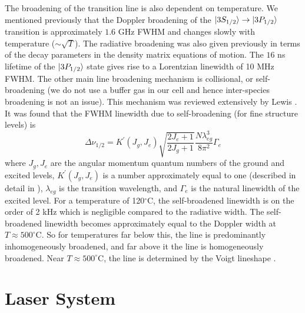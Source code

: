 The broadening of the transition line is also dependent on temperature.  We
mentioned previously that the Doppler broadening of the
$\vert 3S_{1/2} \rangle\rightarrow\vert 3P_{1/2} \rangle$ transition is approximately $1.6$ GHz
FWHM and changes slowly with temperature ($\sim \sqrt{T}$).  The
radiative broadening was also given previously in terms of the decay parameters
in the density matrix equations of motion.  The $16$ ns lifetime of the
$\vert 3P_{1/2} \rangle$ state gives rise to a Lorentzian linewidth of 10 MHz FWHM.
The other main line broadening mechanism is collisional, or self-broadening (we
do not use a buffer gas in our cell and hence inter-species broadening is not
an issue).  This mechanism was reviewed extensively by Lewis \cite{Lewis:80}. 
It was found that the FWHM linewidth due to self-broadening (for fine structure
levels) is
\begin{equation}
\Delta \nu_{1/2} = K^{'}(J_g,J_e)\sqrt{\frac{2J_e+1}{2J_g+1}} \frac{N
\lambda_{eg}^3}{8 \pi^2}\Gamma_e
\end{equation}
where $J_g,J_e$ are the angular momentum quantum numbers of the ground and
excited levels, $K^{'}(J_g,J_e)$ is a number approximately equal to one
(described in detail in \cite{Lewis:80}),
$\lambda_{eg}$ is the transition wavelength, and $\Gamma_e$ is the natural
linewidth of the excited level.  For a temperature of 120$^{\circ}$C, the
self-broadened linewidth is on the order of 2 kHz which is
negligible compared to the radiative width.  The self-broadened linewidth
becomes approximately equal to the Doppler width at $T \approx 500^{\circ}$C. 
So for temperatures far below this, the line is predominantly inhomogeneously
broadened, and far above it the line is homogeneously broadened.  Near $T
\approx 500^{\circ}$C, the line is determined by the Voigt lineshape
\cite{Corney_book}.
\section{Laser System}

\begin{figure}[tb]
\bigskip
{}
\end{figure}


